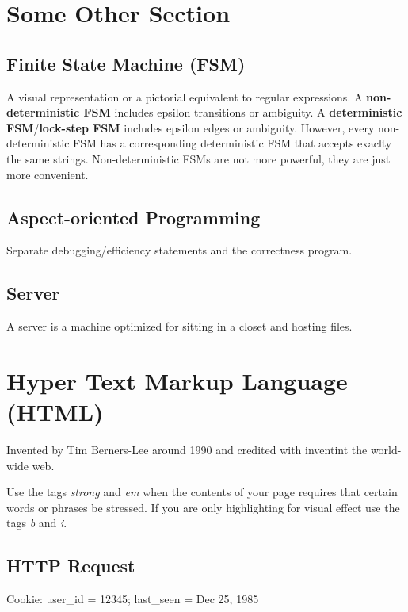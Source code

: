 \documentclass[12pt]{article}
\begin{document}
\section{Some Other Section}

\subsection*{Finite State Machine (FSM)}
A visual representation or a pictorial equivalent to regular expressions. A \textbf{non-deterministic FSM} includes epsilon transitions or ambiguity. 
A \textbf{deterministic FSM}/\textbf{lock-step FSM} includes  epsilon edges or ambiguity. However, every non-deterministic FSM has a corresponding deterministic FSM that accepts exaclty the same strings. Non-deterministic FSMs are not more powerful, they are just more convenient.

\subsection{Aspect-oriented Programming}
Separate debugging/efficiency statements and the correctness program.

\subsection*{Server}
A server is a machine optimized for sitting in a closet and hosting files.

\section{Hyper Text Markup Language (HTML)}

Invented by Tim Berners-Lee around 1990 and credited with inventint the world-wide web.

Use the tags \emph{strong} and \emph{em} when the contents of your page requires that certain words or phrases be stressed. If you are only highlighting for visual effect use the tags \emph{b} and \emph{i}.

\subsection{HTTP Request}

\begin{list}{*}{
\setlength{\itemsep}{0pt}
\setlength{\parsep}{0pt}
\setlength{\topsep}{0pt}
\setlength{\partopsep}{0pt}
\setlength{\leftmargin}{2em}
\setlength{\labelwidth}{1.5em}
\setlength{\labelsep}{0.5em}
}
\item Cookie: user\_id = 12345; last\_seen = Dec 25, 1985
\end{list}
\end{document}
